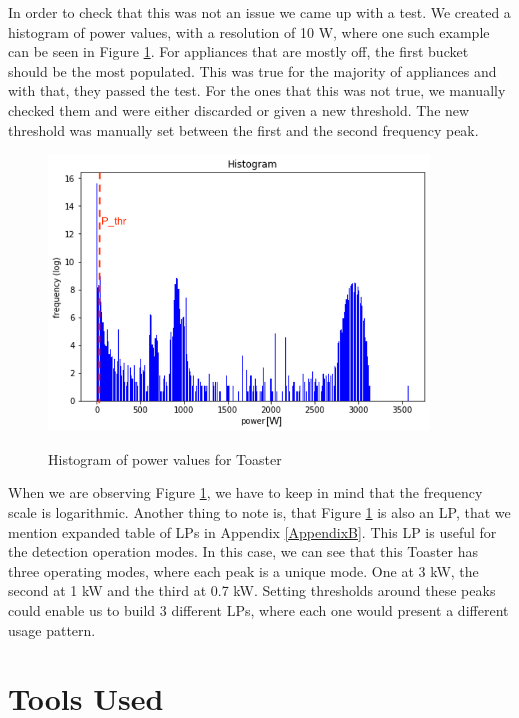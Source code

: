 In order to check that this was not an issue we came up with a test.
We created a histogram of power values, with a resolution of 10 W, where one such example can be seen in Figure \ref{fig:freq_pthr}.
For appliances that are mostly off, the first bucket should be the most populated.
This was true for the majority of appliances and with that, they passed the test.
For the ones that this was not true, we manually checked them and were either discarded or given a new threshold.
The new threshold was manually set between the first and the second frequency peak. 

\begin{figure}[H]
	\centering
	\caption{Histogram of power values for Toaster}
	\includegraphics[width=0.9\textwidth]{Figures/profile_sketches/freq_pthr.png}
	\label{fig:freq_pthr}
\end{figure}

When we are observing Figure \ref{fig:freq_pthr}, we have to keep in mind that the frequency scale is logarithmic.
Another thing to note is, that Figure \ref{fig:freq_pthr} is also an LP, that we mention expanded table of LPs in Appendix \ref{AppendixB}.
This LP is useful for the detection operation modes.
In this case, we can see that this Toaster has three operating modes, where each peak is a unique mode.
One at 3 kW, the second at 1 kW and the third at 0.7 kW.
Setting thresholds around these peaks could enable us to build 3 different LPs, where each one would present a different usage pattern.

\section{Tools Used}

